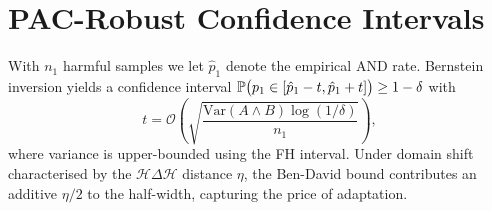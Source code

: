 \section{PAC-Robust Confidence Intervals}
With $n_1$ harmful samples we let $\hat p_1$ denote the empirical AND rate. Bernstein inversion yields a
confidence interval $\mathbb{P}\bigl(p_1 \in [\hat p_1 - t,\hat p_1 + t]\bigr) \ge 1-\delta$ with
\[
t = \mathcal{O}\!\left(\sqrt{\frac{\mathrm{Var}(A\wedge B)\log(1/\delta)}{n_1}}\right),
\]
where variance is upper-bounded using the FH interval. Under domain shift characterised by the
$\mathcal{H}\Delta\mathcal{H}$ distance $\eta$, the Ben-David bound contributes an additive $\eta/2$ to the
half-width, capturing the price of adaptation.
